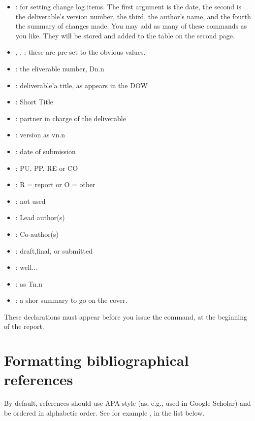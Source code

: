 \documentclass[10pt]{report}
\begin{document}
\begin{itemize}
\item {}: for setting change log
  items. The first argument is the date, the second is the
  deliverable's version number, the third, the author's name, and the
  fourth the summary of changes made. You may add as many of these
  commands as you like. They will be stored and added to the table on
  the second page.  
\item {},
  ,
  : these are pre-set to the obvious
  values. 
\item {}: the eliverable number, Dn.n
\item {}: deliverable'a title, as appears in the DOW
\item {}: Short Title
\item {}: partner in charge of the deliverable
\item {}: version as vn.n
\item {}: date of submission
\item {}: PU, PP, RE or CO
\item {}: R = report or O = other
\item {}: not used
\item {}: Lead author(s)
\item {}: Co-author(s)
\item {}: draft,final, or submitted
\item {}: well...
\item {}: as Tn.n
\item {}: a shor summary to go on the cover.
\end{itemize}

These declarations must appear before you issue the 
command, at the beginning of the report.

\section{Formatting bibliographical references}

By default, references should use APA style (as, e.g., used in Google
Scholar) and be ordered in alphabetic order. See for example
\cite{bib:tan2004selecting}, in the list below.
\end{document}
